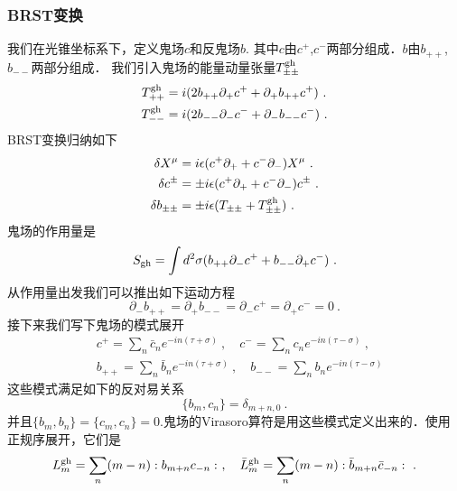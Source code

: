 \subsubsection{BRST变换}
我们在光锥坐标系下，定义鬼场$c$和反鬼场$b$. 其中$c$由$c^+$,$c^-$两部分组成．$b$由$b_{++}$,$b_{--}$两部分组成． 我们引入鬼场的能量动量张量$T^{\rm gh}_{\pm\pm}$
\begin{equation}
\begin{aligned}
T^{\rm gh}_{++} &  = i (2 b_{++}\partial_+ c^+ +\partial_+ b_{++}c^+)~. \\
T^{\rm gh}_{--} &  = i (2 b_{--}\partial_- c^- +\partial_- b_{--}c^-)~.
\end{aligned}
\end{equation}
BRST变换归纳如下
\begin{equation}
\begin{aligned}
\delta X^\mu & = i \epsilon (c^+\partial_+ + c^- \partial_- ) X^\mu~. \\
\delta c^{\pm} & = \pm i \epsilon (c^+\partial_++c^-\partial_-) c^{\pm} ~. \\
\delta b_{\pm\pm} & = \pm i \epsilon (T_{\pm\pm} +T^{\rm gh}_{\pm\pm})~. 
\end{aligned}
\end{equation}
鬼场的作用量是
\begin{equation}
S_{\rm gh} = \int d^2\sigma (b_{++} \partial_- c^+ + b_{--} \partial_+ c^- ) ~.
\end{equation}
从作用量出发我们可以推出如下运动方程
\begin{equation}
\partial_- b_{++} = \partial_+ b_{--} = \partial_- c^+  = \partial_+ c^- = 0~.
\end{equation}
接下来我们写下鬼场的模式展开
\begin{equation}
\begin{aligned}
& c^+ = \sum_n \bar c_n e^{-i n (\tau+\sigma)} ~, \quad c^- = \sum_n c_n e^{-in(\tau-\sigma)} ~, \\
& b_{++} = \sum_n \bar b_n e^{-i n (\tau+\sigma)}~, \quad b_{--} = \sum_n b_n e^{-in(\tau-\sigma)}
\end{aligned}
\end{equation}
这些模式满足如下的反对易关系
\begin{equation}
\{b_m,c_n\} = \delta_{m+n,0}~.
\end{equation}
并且$\{b_m,b_n\}=\{c_m,c_n\}=0$.鬼场的Virasoro算符是用这些模式定义出来的．使用正规序展开，它们是
\begin{equation}
L_m^{\rm gh} = \sum_n (m-n):b_{m+n}c_{-n}:~, \quad \bar L_m^{\rm gh} = \sum_n (m-n) :\bar b_{m+n}\bar c_{-n}:~. 
\end{equation}
